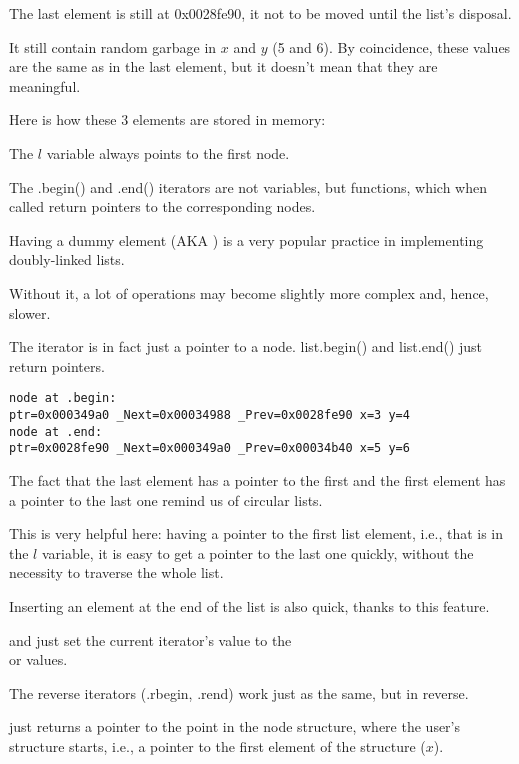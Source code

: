 The last element is still at 0x0028fe90,
it not to be moved until the list's disposal.

It still contain random garbage in $x$ and $y$ (5 and 6). 
By coincidence, these values are the same as in the last element, but it doesn't mean that they are meaningful.

Here is how these 3 elements are stored in memory:



The $l$ variable always points to the first node.

The .begin() and .end() iterators are not variables, but functions, 
which when called return pointers to the corresponding nodes.

Having a dummy element (\ac{AKA} ) is a very popular practice in implementing doubly-linked lists.

Without it, a lot of operations may become slightly more complex and, hence, slower.

The iterator is in fact just a pointer to a node.
list.begin() and list.end() just return pointers.

\begin{lstlisting}
node at .begin:
ptr=0x000349a0 _Next=0x00034988 _Prev=0x0028fe90 x=3 y=4
node at .end:
ptr=0x0028fe90 _Next=0x000349a0 _Prev=0x00034b40 x=5 y=6
\end{lstlisting}

The fact that the last element has a pointer to the first and the first element has a pointer 
to the last one remind us of circular lists.

This is very helpful here: having a pointer to the first list element,
i.e., that is in the $l$ variable,
it is easy to get a pointer to the last one quickly, without the necessity to traverse the whole list.

Inserting an element at the end of the list is also quick, thanks to this feature.

 and  just set the current iterator's value to the \\
 or  values.

The reverse iterators (.rbegin, .rend) work just as the same, but in reverse.

 just returns a pointer to the point 
in the node structure, where the user's structure starts, i.e., a pointer to the 
first element of the structure ($x$).

